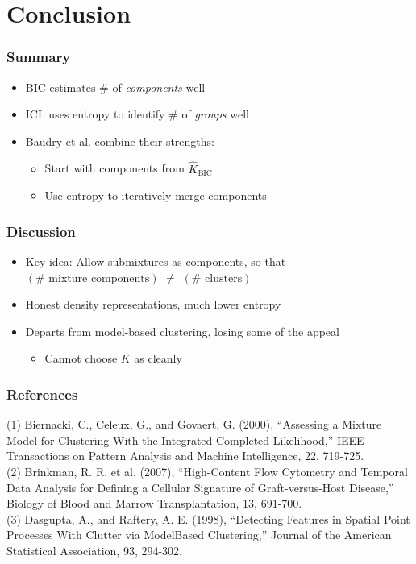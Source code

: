 \documentclass[mathserif,compress]{beamer}
\newcommand*\estim[1]{\widehat{#1}}
\renewcommand\;{\,}
\begin{document}
\section{Conclusion}
\begin{frame}\frametitle{Summary}
\begin{itemize}
\item[]
BIC estimates \# of \emph{components} well 
\bigskip
\item[]
ICL uses entropy to identify \# of \emph{groups} well
\bigskip
\item[]
Baudry et al. combine their strengths:
\begin{itemize}
\bigskip
\item
Start with components from $\estim K_\text{BIC}$
\bigskip
\item
Use entropy to iteratively merge components
\end{itemize}
\end{itemize}
\end{frame}

\begin{frame}\frametitle{Discussion}
\begin{itemize}
\item[]
\alert{Key idea:} Allow submixtures as components, so that $\left(\# \text{ mixture components}\right)$ 
$\ne$ 
$\left(\# \text{ clusters} \right)$
\bigskip
\item[]
Honest density representations, much lower entropy
\bigskip
\item[]
Departs from model-based clustering, losing some of the appeal
\bigskip
\begin{itemize}
\item
Cannot choose $K$ as cleanly
\end{itemize}
\end{itemize}
\end{frame}

\begin{frame}\frametitle{References}
(1)
Biernacki, C., Celeux, G., and Govaert, G. (2000), ``Assessing a Mixture Model for Clustering With the Integrated
Completed Likelihood,'' IEEE Transactions on Pattern Analysis and Machine Intelligence, 22, 719-725.
\\ \bigskip
(2) Brinkman, R. R. et al. (2007), ``High-Content Flow Cytometry and Temporal Data Analysis for Defining a Cellular Signature of
Graft-versus-Host Disease,'' Biology of Blood and Marrow Transplantation, 13, 691-700.
\\ \bigskip
(3) Dasgupta, A., and Raftery, A. E. (1998), ``Detecting Features in Spatial Point Processes With Clutter via ModelBased
Clustering,'' Journal of the American Statistical Association, 93, 294-302. 
\end{frame}
\end{document}
